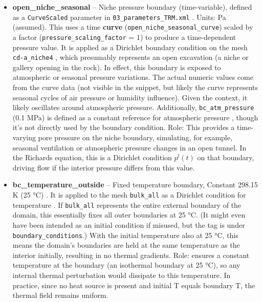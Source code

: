 \documentclass[10pt,a4paper]{article}
\begin{document}
\begin{itemize}
    \item \textbf{open\_niche\_seasonal} -- Niche pressure boundary (time-variable), defined as a \texttt{CurveScaled} parameter in \texttt{03\_parameters\_TRM.xml} \cite{file:03_parameters_TRM}. Units: Pa (assumed). This uses a time \textbf{curve} (\texttt{open\_niche\_seasonal\_curve}) scaled by a factor (\texttt{pressure\_scaling\_factor} = 1) to produce a time-dependent pressure value. It is applied as a Dirichlet boundary condition on the mesh \texttt{cd-a\_niche4} \cite{file:02_process_variables_TRM}, which presumably represents an open excavation (a niche or gallery opening in the rock). In effect, this boundary is exposed to atmospheric or seasonal pressure variations. The actual numeric values come from the curve data (not visible in the snippet, but likely the curve represents seasonal cycles of air pressure or humidity influence). Given the context, it likely oscillates around atmospheric pressure. Additionally, \texttt{bc\_atm\_pressure} (0.1 MPa) is defined as a constant reference for atmospheric pressure \cite{file:03_parameters_TRM}, though it's not directly used by the boundary condition. Role: This provides a time-varying pore pressure on the niche boundary, simulating, for example, seasonal ventilation or atmospheric pressure changes in an open tunnel. In the Richards equation, this is a Dirichlet condition $p^l(t)$ on that boundary, driving flow if the interior pressure differs from this value.

    \item \textbf{bc\_temperature\_outside} -- Fixed temperature boundary, Constant 298.15 K (25 °C) \cite{file:03_parameters_TRM}. It is applied to the mesh \texttt{bulk\_all} as a Dirichlet condition for temperature \cite{file:02_process_variables_TRM}. If \texttt{bulk\_all} represents the entire external boundary of the domain, this essentially fixes all outer boundaries at 25 °C. (It might even have been intended as an initial condition if misused, but the tag is under \texttt{boundary\_conditions}.) With the initial temperature also at 25 °C, this means the domain's boundaries are held at the same temperature as the interior initially, resulting in no thermal gradients. Role: ensures a constant temperature at the boundary (an isothermal boundary at 25 °C), so any internal thermal perturbation would dissipate to this temperature. In practice, since no heat source is present and initial T equals boundary T, the thermal field remains uniform.


\end{itemize}
\end{document}
